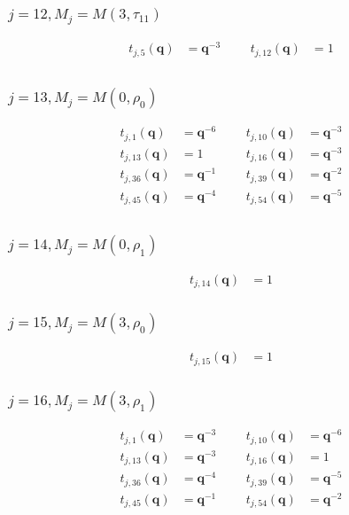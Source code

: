 \subsubsection{$j=12, M_{j}=M(3,\tau_{11})$}
\begin{align*}
t_{j,5}(\boldsymbol{q})&=\boldsymbol{q}^{-3} &&& t_{j,12}(\boldsymbol{q})&=1 \\
\end{align*}

\subsubsection{$j=13, M_{j}=M(0,\rho_{0})$}
\begin{align*}
t_{j,1}(\boldsymbol{q})&=\boldsymbol{q}^{-6} &&& t_{j,10}(\boldsymbol{q})&=\boldsymbol{q}^{-3} \\
t_{j,13}(\boldsymbol{q})&=1 &&& t_{j,16}(\boldsymbol{q})&=\boldsymbol{q}^{-3} \\
t_{j,36}(\boldsymbol{q})&=\boldsymbol{q}^{-1} &&& t_{j,39}(\boldsymbol{q})&=\boldsymbol{q}^{-2} \\
t_{j,45}(\boldsymbol{q})&=\boldsymbol{q}^{-4} &&& t_{j,54}(\boldsymbol{q})&=\boldsymbol{q}^{-5} \\
\end{align*}

\subsubsection{$j=14, M_{j}=M(0,\rho_{1})$}
\begin{align*}
t_{j,14}(\boldsymbol{q})&=1
\end{align*}

\subsubsection{$j=15, M_{j}=M(3,\rho_{0})$}
\begin{align*}
t_{j,15}(\boldsymbol{q})&=1
\end{align*}

\subsubsection{$j=16, M_{j}=M(3,\rho_{1})$}
\begin{align*}
t_{j,1}(\boldsymbol{q})&=\boldsymbol{q}^{-3} &&& t_{j,10}(\boldsymbol{q})&=\boldsymbol{q}^{-6} \\
t_{j,13}(\boldsymbol{q})&=\boldsymbol{q}^{-3} &&& t_{j,16}(\boldsymbol{q})&=1 \\
t_{j,36}(\boldsymbol{q})&=\boldsymbol{q}^{-4} &&& t_{j,39}(\boldsymbol{q})&=\boldsymbol{q}^{-5} \\
t_{j,45}(\boldsymbol{q})&=\boldsymbol{q}^{-1} &&& t_{j,54}(\boldsymbol{q})&=\boldsymbol{q}^{-2} \\
\end{align*}

